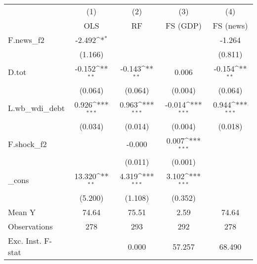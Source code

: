 {
\def\sym#1{\ifmmode^{#1}\else\(^{#1}\)\fi}
\begin{tabular}{l*{4}{c}}
\toprule
            &\multicolumn{1}{c}{(1)}&\multicolumn{1}{c}{(2)}&\multicolumn{1}{c}{(3)}&\multicolumn{1}{c}{(4)}\\
            &\multicolumn{1}{c}{OLS}&\multicolumn{1}{c}{RF}&\multicolumn{1}{c}{FS (GDP)}&\multicolumn{1}{c}{FS (news)}\\
\midrule
F.news\_f2   &      -2.492\sym{*}  &                     &                     &      -1.264         \\
            &     (1.166)         &                     &                     &     (0.811)         \\
\addlinespace
D.tot       &      -0.152\sym{**} &      -0.143\sym{**} &       0.006         &      -0.154\sym{**} \\
            &     (0.064)         &     (0.064)         &     (0.004)         &     (0.064)         \\
\addlinespace
L.wb\_wdi\_debt&       0.926\sym{***}&       0.963\sym{***}&      -0.014\sym{***}&       0.944\sym{***}\\
            &     (0.034)         &     (0.014)         &     (0.004)         &     (0.018)         \\
\addlinespace
F.shock\_f2  &                     &      -0.000         &       0.007\sym{***}&                     \\
            &                     &     (0.011)         &     (0.001)         &                     \\
\addlinespace
\_cons      &      13.320\sym{**} &       4.319\sym{***}&       3.102\sym{***}&                     \\
            &     (5.200)         &     (1.108)         &     (0.352)         &                     \\
\midrule
Mean Y      &       74.64         &       75.51         &        2.59         &       74.64         \\
Observations&         278         &         293         &         292         &         278         \\
Exc. Inst. F-stat&                     &       0.000         &      57.257         &      68.490         \\
\bottomrule
\end{tabular}
}
